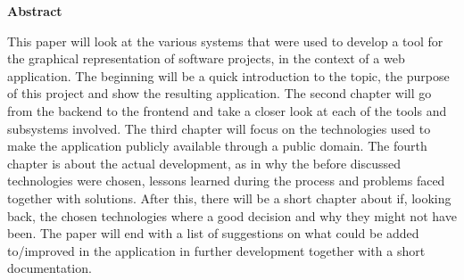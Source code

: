 \newpage

\vspace*{1cm}

\begin{center}
    \textbf{Abstract}
\end{center}

\vspace*{1cm}

\noindent
This paper will look at the various systems that were used to develop a tool for the graphical representation of software projects, in the context of a web application. The beginning will be a quick introduction to the topic, the purpose of this project and show the resulting application. The second chapter will go from the backend to the frontend and take a closer look at each of the tools and subsystems involved. The third chapter will focus on the technologies used to make the application publicly available through a public domain. The fourth chapter is about the actual development, as in why the before discussed technologies were chosen, lessons learned during the process and problems faced together with solutions. After this, there will be a short chapter about if, looking back, the chosen technologies where a good decision and why they might not have been. The paper will end with a list of suggestions on what could be added to/improved in the application in further development together with a short documentation.

